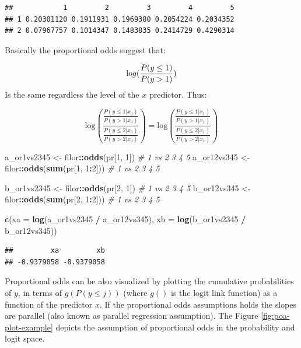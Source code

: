 \documentclass[
  man,floatsintext]{apa6}
\newenvironment{Shaded}{\begin{snugshade}}{\end{snugshade}}
\newcommand{\AttributeTok}[1]{\textcolor[rgb]{0.13,0.29,0.53}{#1}}
\newcommand{\CommentTok}[1]{\textcolor[rgb]{0.56,0.35,0.01}{\textit{#1}}}
\newcommand{\DecValTok}[1]{\textcolor[rgb]{0.00,0.00,0.81}{#1}}
\newcommand{\FunctionTok}[1]{\textcolor[rgb]{0.13,0.29,0.53}{\textbf{#1}}}
\newcommand{\NormalTok}[1]{#1}
\newcommand{\OtherTok}[1]{\textcolor[rgb]{0.56,0.35,0.01}{#1}}
\newcommand{\SpecialCharTok}[1]{\textcolor[rgb]{0.81,0.36,0.00}{\textbf{#1}}}
\begin{document}
\begin{verbatim}
##            1         2         3         4         5
## 1 0.20301120 0.1911931 0.1969380 0.2054224 0.2034352
## 2 0.07967757 0.1014347 0.1483835 0.2414729 0.4290314
\end{verbatim}

Basically the proportional odds suggest that:

\[
\text log(\frac{P(y \leq 1)}{P(y > 1)})
\]
Is the same regardless the level of the \(x\) predictor. Thus:

\[
\text{log}\left(\frac{\frac{P(y \leq 1|x_0)}{P(y > 1|x_0)}}{\frac{P(y \leq 2|x_0)}{P(y > 2|x_0)}}\right) = \text{log}\left(\frac{\frac{P(y \leq 1|x_1)}{P(y > 1|x_1)}}{\frac{P(y \leq 2|x_1)}{P(y > 2|x_1)}}\right)
\]

\begin{Shaded}
\begin{Highlighting}[]
\NormalTok{a\_or1vs2345 }\OtherTok{\textless{}{-}}\NormalTok{ filor}\SpecialCharTok{::}\FunctionTok{odds}\NormalTok{(pr[}\DecValTok{1}\NormalTok{, }\DecValTok{1}\NormalTok{]) }\CommentTok{\# 1 vs 2 3 4 5}
\NormalTok{a\_or12vs345 }\OtherTok{\textless{}{-}}\NormalTok{ filor}\SpecialCharTok{::}\FunctionTok{odds}\NormalTok{(}\FunctionTok{sum}\NormalTok{(pr[}\DecValTok{1}\NormalTok{, }\DecValTok{1}\SpecialCharTok{:}\DecValTok{2}\NormalTok{])) }\CommentTok{\# 1 vs 2 3 4 5}

\NormalTok{b\_or1vs2345 }\OtherTok{\textless{}{-}}\NormalTok{ filor}\SpecialCharTok{::}\FunctionTok{odds}\NormalTok{(pr[}\DecValTok{2}\NormalTok{, }\DecValTok{1}\NormalTok{]) }\CommentTok{\# 1 vs 2 3 4 5}
\NormalTok{b\_or12vs345 }\OtherTok{\textless{}{-}}\NormalTok{ filor}\SpecialCharTok{::}\FunctionTok{odds}\NormalTok{(}\FunctionTok{sum}\NormalTok{(pr[}\DecValTok{2}\NormalTok{, }\DecValTok{1}\SpecialCharTok{:}\DecValTok{2}\NormalTok{])) }\CommentTok{\# 1 vs 2 3 4 5}

\FunctionTok{c}\NormalTok{(}\AttributeTok{xa =} \FunctionTok{log}\NormalTok{(a\_or1vs2345 }\SpecialCharTok{/}\NormalTok{ a\_or12vs345), }\AttributeTok{xb =} \FunctionTok{log}\NormalTok{(b\_or1vs2345 }\SpecialCharTok{/}\NormalTok{ b\_or12vs345))}
\end{Highlighting}
\end{Shaded}

\begin{verbatim}
##         xa         xb 
## -0.9379058 -0.9379058
\end{verbatim}

Proportional odds can be also visualized by plotting the cumulative probabilities of \(y\), in terms of \(g(P(y \leq j))\) (where \(g()\) is the logit link function) as a function of the predictor \(x\). If the proportional odds assumptions holds the slopes are parallel (also known as parallel regression assumption). The Figure \ref{fig:poa-plot-example} depicts the assumption of proportional odds in the probability and logit space.
\end{document}
